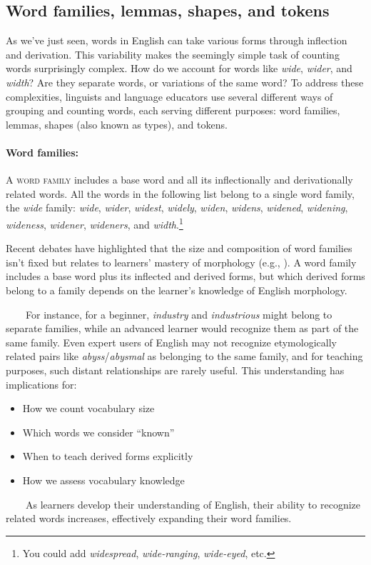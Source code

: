 \subsection{Word families, lemmas, shapes, and tokens}\label{sec:family-lemma-shape-token}

As we've just seen, words in English can take various forms through inflection and derivation. This variability makes the seemingly simple task of counting words surprisingly complex. How do we account for words like \textit{wide}, \textit{wider}, and \textit{width}? Are they separate words, or variations of the same word? To address these complexities, linguists and language educators use several different ways of grouping and counting words, each serving different purposes: word families, lemmas, shapes (also known as types), and tokens.

\paragraph*{Word families:}A \textsc{word family} includes a base word and all its inflectionally and derivationally related words. All the words in the following list belong to a single word family, the \textit{wide} family: \textit{wide},
\textit{wider},
\textit{widest},
\textit{widely},
\textit{widen},
\textit{widens},
\textit{widened},
\textit{widening},
\textit{wideness},
\textit{widener},
\textit{wideners}, and
\textit{width}.\footnote{You could add \textit{widespread}, \textit{wide-ranging}, \textit{wide-eyed}, etc.}

\begin{tcolorbox}[title=Word Families and Morphological Development] \label{sec:word-family-debate}

Recent debates have highlighted that the size and composition of word families isn't fixed but relates to learners' mastery of morphology (e.g., \cite{Webb2021}). A word family includes a base word plus its inflected and derived forms, but which derived forms belong to a family depends on the learner's knowledge of English morphology.

~~~~For instance, for a beginner, \textit{industry} and \textit{industrious} might belong to separate families, while an advanced learner would recognize them as part of the same family. Even expert users of English may not recognize etymologically related pairs like \textit{abyss}/\textit{abysmal} as belonging to the same family, and for teaching purposes, such distant relationships are rarely useful. This understanding has implications for:


\begin{itemize}
    \item How we count vocabulary size
    \item Which words we consider ``known''
    \item When to teach derived forms explicitly
    \item How we assess vocabulary knowledge
\end{itemize}

~~~~As learners develop their understanding of English, their ability to recognize related words increases, effectively expanding their word families.
\end{tcolorbox}

